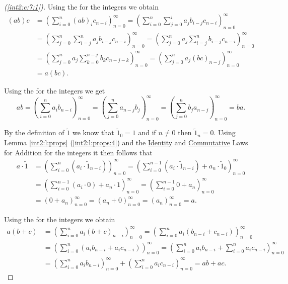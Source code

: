 \begin{proof}[(\ref{int2:e:7:1})]
	Using the  for the integers we obtain
	\begin{align*}
		(a b) c & = \left( \sum_{i=0}^{n}(a b)_{i} c_{n-i} \right)_{n=0}^\infty = \left( \sum_{i=0}^{n} \sum_{j=0}^{i} a_{j} b_{i-j} c_{n-i}  \right)_{n=0}^\infty                    \\
		        & = \left( \sum_{j=0}^{n} \sum_{i=j}^{n} a_{j} b_{i-j} c_{n-i} \right)_{n=0}^\infty = \left( \sum_{j=0}^{n} a_{j} \sum_{i=j}^{n} b_{i-j} c_{n-i} \right)_{n=0}^\infty \\
		        & = \left( \sum_{j=0}^{n} a_{j} \sum_{k=0}^{n-j} b_{k} c_{n-j-k} \right)_{n=0}^\infty = \left( \sum_{j=0}^{n} a_{j}(b c)_{n-j} \right)_{n=0}^\infty                   \\
		        & = a(b c).
	\end{align*}

	Using the  for the integers we get
	$$
		a b = \left( \sum_{i=0}^n a_{i} b_{n-i} \right)_{n=0}^\infty = \left( \sum_{j=0}^n a_{n-j} b_{j} \right)_{n=0}^\infty = \left( \sum_{j=0}^n b_{j} a_{n-j} \right)_{n=0}^\infty = b a.
	$$


	By the definition of $\widetilde{1}$ we know that $\widetilde{1}_0 = 1$ and if $n \not= 0$ then $\widetilde{1}_n = 0$. Using Lemma \ref{int2:l:props} (\ref{int2:l:props:4}) and the \hyperref[int2:d:oid:identity_add]{Identity} and \hyperref[int2:d:oid:commutative_add]{Commutative} Laws for Addition for the integers it then follows that
	\begin{align*}
		a \cdot \widetilde{1} & = \left( \sum_{i=0}^n (a_i \cdot \widetilde{1}_{n-i}) \right)_{n=0}^\infty
		= \left( \sum_{i=0}^{n-1} (a_i \cdot \widetilde{1}_{n-i}) + a_n \cdot \widetilde{1}_0 \right)_{n=0}^\infty \\
		\
		                      & = \left( \sum_{i=0}^{n-1} (a_i \cdot 0) + a_n \cdot 1 \right)_{n=0}^\infty
		= \left( \sum_{i=0}^{n-1} 0 + a_n \right)_{n=0}^\infty                                                     \\
		\
		                      & = (0 + a_n)_{n=0}^\infty = (a_n + 0)_{n=0}^\infty = (a_n)_{n=0}^\infty = a.
	\end{align*}

	Using the  for the integers we obtain
	\begin{align*}
		a(b + c) & = \left( \sum_{i=0}^n a_i(b + c)_{n-i} \right)_{n=0}^\infty = \left( \sum_{i=0}^n a_i(b_{n-i} + c_{n-i}) \right)_{n=0}^\infty                            \\
		         & = \left( \sum_{i=0}^n (a_i b_{n-i} + a_i c_{n-i}) \right)_{n=0}^\infty = \left( \sum_{i=0}^n a_i b_{n-i} + \sum_{i=0}^n a_i c_{n-i} \right)_{n=0}^\infty \\
		         & = \left( \sum_{i=0}^n a_i b_{n-i} \right)_{n=0}^\infty + \left( \sum_{i=0}^n a_i c_{n-i} \right)_{n=0}^\infty = a b + a c.
	\end{align*}


\end{proof}
